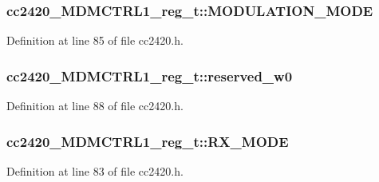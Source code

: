 \subsubsection[{\texorpdfstring{M\+O\+D\+U\+L\+A\+T\+I\+O\+N\+\_\+\+M\+O\+DE}{MODULATION_MODE}}]{ cc2420\+\_\+\+M\+D\+M\+C\+T\+R\+L1\+\_\+reg\+\_\+t\+::\+M\+O\+D\+U\+L\+A\+T\+I\+O\+N\+\_\+\+M\+O\+DE}\hypertarget{structcc2420___m_d_m_c_t_r_l1__reg__t_ae349cbd97a630e7245d664838d0742db}{}\label{structcc2420___m_d_m_c_t_r_l1__reg__t_ae349cbd97a630e7245d664838d0742db}


Definition at line 85 of file cc2420.\+h.

\subsubsection[{\texorpdfstring{reserved\+\_\+w0}{reserved_w0}}]{ cc2420\+\_\+\+M\+D\+M\+C\+T\+R\+L1\+\_\+reg\+\_\+t\+::reserved\+\_\+w0}\hypertarget{structcc2420___m_d_m_c_t_r_l1__reg__t_a00a363fe23a08ddc39d91c58edeb8dac}{}\label{structcc2420___m_d_m_c_t_r_l1__reg__t_a00a363fe23a08ddc39d91c58edeb8dac}


Definition at line 88 of file cc2420.\+h.

\subsubsection[{\texorpdfstring{R\+X\+\_\+\+M\+O\+DE}{RX_MODE}}]{ cc2420\+\_\+\+M\+D\+M\+C\+T\+R\+L1\+\_\+reg\+\_\+t\+::\+R\+X\+\_\+\+M\+O\+DE}\hypertarget{structcc2420___m_d_m_c_t_r_l1__reg__t_a456f3a71cad0d6f0ad0b2893a0a9360b}{}\label{structcc2420___m_d_m_c_t_r_l1__reg__t_a456f3a71cad0d6f0ad0b2893a0a9360b}


Definition at line 83 of file cc2420.\+h.

